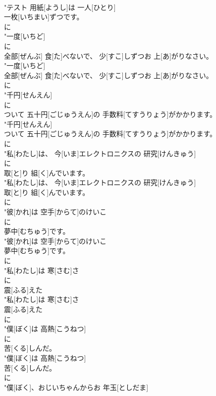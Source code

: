 \documentclass[8pt]{extreport}
\begin{document}
\begin{CJK}{UTF8}{min}
\\	"テスト 用紙[ようし]は 一人[ひとり]
\\	一枚[いちまい]ずつです。
\\	に
\\	"一度[いちど]
\\	に
\\	全部[ぜんぶ] 食[た]べないで、 少[すこ]しずつお 上[あ]がりなさい。
\\	"一度[いちど]
\\	全部[ぜんぶ] 食[た]べないで、 少[すこ]しずつお 上[あ]がりなさい。
\\	に
\\	"千円[せんえん]
\\	に
\\	ついて 五十円[ごじゅうえん]の 手数料[てすうりょう]がかかります。
\\	"千円[せんえん]
\\	ついて 五十円[ごじゅうえん]の 手数料[てすうりょう]がかかります。
\\	に
\\	"私[わたし]は、 今[いま]エレクトロニクスの 研究[けんきゅう]
\\	に
\\	取[と]り 組[く]んでいます。
\\	"私[わたし]は、 今[いま]エレクトロニクスの 研究[けんきゅう]
\\	取[と]り 組[く]んでいます。
\\	に
\\	"彼[かれ]は 空手[からて]のけいこ
\\	に
\\	夢中[むちゅう]です。
\\	"彼[かれ]は 空手[からて]のけいこ
\\	夢中[むちゅう]です。
\\	に
\\	"私[わたし]は 寒[さむ]さ
\\	に
\\	震[ふる]えた
\\	"私[わたし]は 寒[さむ]さ
\\	震[ふる]えた
\\	に
\\	"僕[ぼく]は 高熱[こうねつ]
\\	に
\\	苦[くる]しんだ。
\\	"僕[ぼく]は 高熱[こうねつ]
\\	苦[くる]しんだ。
\\	に
\\	"僕[ぼく]、おじいちゃんからお 年玉[としだま]

\end{CJK}
\end{document}
